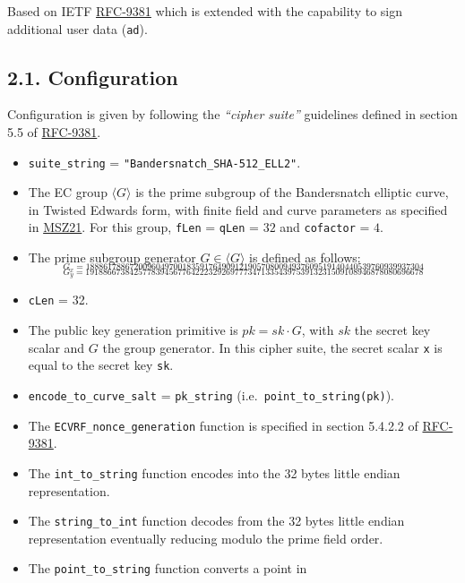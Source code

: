 \documentclass[
]{article}
\begin{document}
Based on IETF \href{https://datatracker.ietf.org/doc/rfc9381}{RFC-9381}
which is extended with the capability to sign additional user data
(\texttt{ad}).

\hypertarget{configuration}{%
\subsection{2.1. Configuration}\label{configuration}}

Configuration is given by following the \emph{``cipher suite''}
guidelines defined in section 5.5 of
\href{https://datatracker.ietf.org/doc/rfc9381}{RFC-9381}.

\begin{itemize}
\item
  \texttt{suite\_string} = \texttt{"Bandersnatch\_SHA-512\_ELL2"}.
\item
  The EC group \(\langle G \rangle\) is the prime subgroup of the
  Bandersnatch elliptic curve, in Twisted Edwards form, with finite
  field and curve parameters as specified in
  \href{https://eprint.iacr.org/2021/1152}{MSZ21}. For this group,
  \texttt{fLen} = \texttt{qLen} = \(32\) and \texttt{cofactor} = \(4\).
\item
  The prime subgroup generator \(G \in \langle G \rangle\) is defined as
  follows:
  \[_{G_x = 18886178867200960497001835917649091219057080094937609519140440539760939937304}\]
  \[_{G_y = 19188667384257783945677642223292697773471335439753913231509108946878080696678}\]
\item
  \texttt{cLen} = 32.
\item
  The public key generation primitive is \(pk = sk \cdot G\), with
  \(sk\) the secret key scalar and \(G\) the group generator. In this
  cipher suite, the secret scalar \texttt{x} is equal to the secret key
  \texttt{sk}.
\item
  \texttt{encode\_to\_curve\_salt} = \texttt{pk\_string}
  (i.e.~\texttt{point\_to\_string(pk)}).
\item
  The \texttt{ECVRF\_nonce\_generation} function is specified in section
  5.4.2.2 of \href{https://datatracker.ietf.org/doc/rfc9381}{RFC-9381}.
\item
  The \texttt{int\_to\_string} function encodes into the 32 bytes little
  endian representation.
\item
  The \texttt{string\_to\_int} function decodes from the 32 bytes little
  endian representation eventually reducing modulo the prime field
  order.
\item
  The \texttt{point\_to\_string} function converts a point in

\end{itemize}
\end{document}
